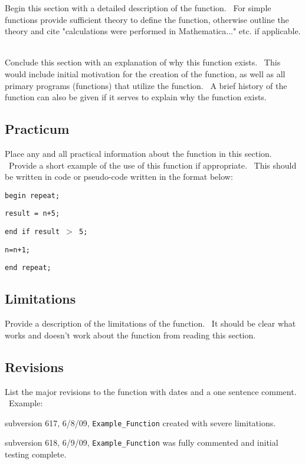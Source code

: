 \documentclass[12pt]{article}%
\begin{document}
Begin this section with a detailed description of the function. \ For simple
functions provide sufficient theory to define the function, otherwise outline
the theory and cite "calculations were performed in Mathematica..." etc. if
applicable. \ 

Conclude this section with an explanation of why this function exists. \ This
would include initial motivation for the creation of the function, as well as
all primary programs (functions) that utilize the function. \ A brief history
of the function can also be given if it serves to explain why the function
exists. \ 

\subsection*{Practicum}

Place any and all practical information about the function in this section.
\ Provide a short example of the use of this function if appropriate. \ This
should be written in code or pseudo-code written in the format below:

\bigskip

\qquad\texttt{begin repeat;}

\qquad\qquad\texttt{result = n+5;}

\qquad\qquad\texttt{end if result
$>$
5;}

\qquad\qquad\texttt{n=n+1;}

\qquad\texttt{end repeat;}

\bigskip

\subsection*{Limitations}

Provide a description of the limitations of the function. \ It should be clear
what works and doesn't work about the function from reading this section. \ 

\subsection*{Revisions}

List the major revisions to the function with dates and a one sentence
comment. \ Example:

subversion 617, 6/8/09, \texttt{Example\_Function} created with severe limitations.

subversion 618, 6/9/09, \texttt{Example\_Function} was fully commented and
initial testing complete.
\end{document}
